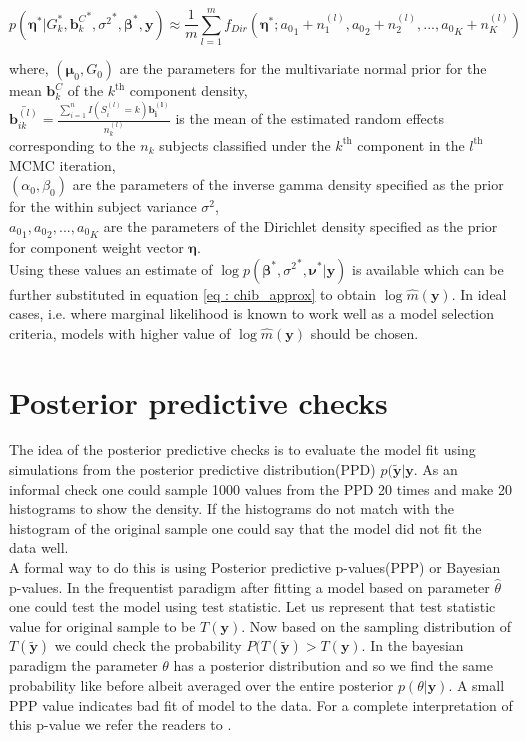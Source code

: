 \begin{equation}
p({\boldsymbol{\eta}}^*|G_k^*, {\boldsymbol{b}_k^C}^*, {\sigma^2}^*,{\boldsymbol{\beta}}^*, \boldsymbol{y}) \approx 
\frac 1 m \sum_{l=1}^m f_{Dir}({\boldsymbol{\eta}}^*; {a_0}_1 + n_1^{(l)}, {a_0}_2 + n_2^{(l)}, ..., {a_0}_K + n_K^{(l)})
\end{equation}

where, 
$(\boldsymbol{\mu}_0, G_0)$ are the parameters for the multivariate normal prior for the mean $\boldsymbol{b}_k^C$ of the $k^\text{th}$ component density,\\
$\bar{\boldsymbol{b}_{ik}^{(l)}} = \frac {\sum_{i=1}^n I(S_i^{(l)}=k) \boldsymbol{b_i^{(l)}}} {n_k^{(l)}}$ is the mean of the estimated random effects corresponding to the $n_k$ subjects classified under the $k^\text{th}$ component in the $l^\text{th}$ MCMC iteration,\\
$(\alpha_0, \beta_0)$ are the parameters of the inverse gamma density specified as the prior for the within subject variance $\sigma^2$,\\
${a_0}_1, {a_0}_2,..., {a_0}_K$ are the parameters of the Dirichlet density specified as the prior for component weight vector $\boldsymbol{\eta}$.\\

Using these values an estimate of $\log{p({\boldsymbol{\beta}}^*, {\sigma^2}^*, \boldsymbol{\nu}^*|\boldsymbol{y})}$ is available which can be further substituted in equation \ref{eq : chib_approx} to obtain $\log{\hat{m}(\boldsymbol{y})}$. In ideal cases, i.e. where marginal likelihood is known to work well as a model selection criteria, models with higher value of $\log{\hat{m}(\boldsymbol{y})}$ should be chosen.


\section{Posterior predictive checks}
\label{sec : ppc}

The idea of the posterior predictive checks is to evaluate the model fit using simulations from the posterior predictive distribution(PPD) $p(\boldsymbol{\tilde{y}}|\boldsymbol{y}$. As an informal check one could sample 1000 values from the PPD 20 times and make 20 histograms to show the density. If the histograms do not match with the histogram of the original sample one could say that the model did not fit the data well.\\ 
A formal way to do this is using Posterior predictive p-values(PPP) or Bayesian p-values. In the frequentist paradigm after fitting a model based on parameter $\hat{\theta}$ one could test the model using test statistic. Let us represent that test statistic value for original sample to be $T(\boldsymbol{y})$. Now based on the sampling distribution of $T(\boldsymbol{\tilde{y}})$ we could check the probability $P(T(\boldsymbol{\tilde{y}}) > T(\boldsymbol{y})$. In the bayesian paradigm the parameter $\theta$ has a posterior distribution and so we find the same probability like before albeit averaged over the entire posterior $p(\theta|\boldsymbol{y})$. A small PPP value indicates bad fit of model to the data. For a complete interpretation of this p-value we refer the readers to \citet{gelman_understanding_2012}.
